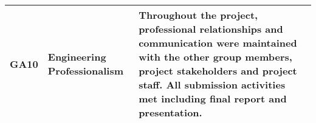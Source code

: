 \documentclass[class=report,11pt,crop=false]{standalone}
\begin{document}
\begin{tabularx}{\textwidth}{|p{} p{} X|}
    GA10 & Engineering Professionalism & Throughout the project, professional relationships and communication were maintained with the other group members, project stakeholders and project staff. All submission activities met including final report and presentation. \\ \hline


\end{tabularx}
\raggedright

\ifstandalone

\printnoidxglossary[type=\acronymtype,nonumberlist]
\fi
\end{document}
